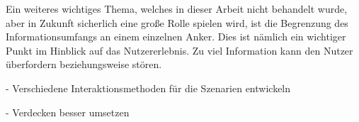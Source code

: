 		
		Ein weiteres wichtiges Thema, welches in dieser Arbeit nicht behandelt wurde, aber in Zukunft sicherlich eine große Rolle spielen wird, ist die Begrenzung des Informationsumfangs an einem einzelnen Anker. Dies ist nämlich ein wichtiger Punkt im Hinblick auf das Nutzererlebnis.  Zu viel Information kann den Nutzer überfordern beziehungsweise stören.
		
		
		- Verschiedene Interaktionsmethoden für die Szenarien entwickeln
		
		- Verdecken besser umsetzen
		
